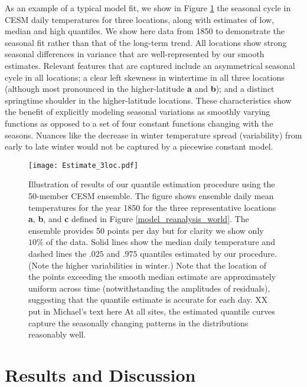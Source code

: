 \documentclass{ametsoc}
\newcommand\smallfigwidth{\columnwidth}
\begin{document}
 As an example of a typical model fit, we show in Figure \ref{Estimate} the seasonal cycle in CESM daily temperatures for three locations, along with estimates of low, median and high quantiles. We show here data from 1850 to demonstrate the seasonal fit rather than that of the long-term trend. All locations show strong seasonal differences in variance that are well-represented by our smooth estimates. Relevant features that are captured include an asymmetrical seasonal cycle in all locations; a clear left skewness in wintertime in all three locations (although most pronounced in the higher-latitude \textbf{a} and \textbf{b}); and a distinct springtime shoulder in the higher-latitude locations. These characteristics show the benefit of explicitly modeling seasonal variations as smoothly varying functions as opposed to a set of four constant functions changing with the seasons. Nuances like the decrease in winter temperature spread (variability) from early to late winter would not be captured by a piecewise constant model.

\begin{figure}[t]       %
\centerline{\texttt{[image: Estimate\_3loc.pdf]}}
\caption{\small{Illustration of results of our quantile estimation procedure using the 50-member CESM ensemble. The figure shows ensemble daily mean temperatures for the year 1850 for the three representative locations \textbf{a}, \textbf{b}, and \textbf{c} defined in Figure \ref{model_reanalysis_world}. The ensemble provides 50 points per day but for clarity we show only $10\%$ of the data. Solid lines show the median daily temperature and dashed lines the $.025$ and $.975$ quantiles estimated by our procedure. %
(Note the higher variabilities in winter.)  Note that the location of the points exceeding the smooth median estimate are approximately uniform across time (notwithstanding the amplitudes of residuals), suggesting that the quantile estimate is accurate for each day. XX put in Michael's text here
At all sites, the estimated quantile curves capture the seasonally changing patterns in the distributions reasonably well.
}} 

\label{Estimate}          %
\end{figure}

\section{Results and Discussion}
\label{sec:results}
\end{document}
